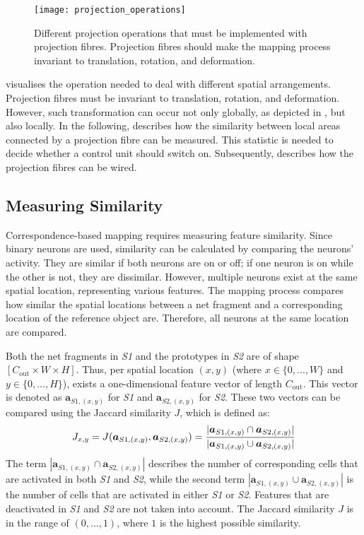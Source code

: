 \begin{figure}[h]
    \centering
    \texttt{[image: projection\_operations]}
    \caption[Different projection operation]{Different projection operations that must be implemented with projection fibres. Projection fibres should make the mapping process invariant to translation, rotation, and deformation.}
\end{figure}
 visualises the operation needed to deal with different spatial arrangements.
Projection fibres must be invariant to translation, rotation, and deformation. However, such transformation can occur not only globally, as depicted in , but also locally.
In the following,  describes how the similarity between local areas connected by a projection fibre can be measured. This statistic is needed to decide whether a control unit should switch on. Subsequently,  describes how the projection fibres can be wired.

\subsection{Measuring Similarity}
Correspondence-based mapping requires measuring feature similarity.
Since binary neurons are used, similarity can be calculated by comparing the neurons' activity. They are similar if both neurons are on or off; if one neuron is on while the other is not, they are dissimilar.
However, multiple neurons exist at the same spatial location, representing various features.
The mapping process compares how similar the spatial locations between a net fragment and a corresponding location of the reference object are.
Therefore, all neurons at the same location are compared.

Both the net fragments in \emph{S1} and the prototypes in \emph{S2} are of shape $[C_{\text{out}} \times W \times H]$. Thus, per spatial location $(x,y)$ (where $x \in \{0, ..., W\}$ and $y \in \{0, ..., H\}$), exists a one-dimensional feature vector of length $C_{\text{out}}$. This vector is denoted as $\boldsymbol{a}_{S1,(x,y)}$ for \emph{S1} and $\boldsymbol{a}_{S2,(x,y)}$ for \emph{S2}.
These two vectors can be compared using the Jaccard similarity $J$, which is defined as:
%
\begin{align}\eqlbl{jaccard}
	J_{x,y} = J(\boldsymbol{a}_{S1,(x,y)}, \boldsymbol{a}_{S2,(x,y)}) = \frac{|\boldsymbol{a}_{S1,(x,y)} \cap \boldsymbol{a}_{S2,(x,y)}|}{|\boldsymbol{a}_{S1,(x,y)} \cup \boldsymbol{a}_{S2,(x,y)}|}
\end{align}
%
The term $|\boldsymbol{a}_{S1,(x,y)} \cap \boldsymbol{a}_{S2,(x,y)}|$ describes the number of corresponding cells that are activated in both \emph{S1} and \emph{S2}, while the second term $|\boldsymbol{a}_{S1,(x,y)} \cup \boldsymbol{a}_{S2,(x,y)}|$ is the number of cells that are activated in either \emph{S1} or \emph{S2}. Features that are deactivated in \emph{S1} and \emph{S2} are not taken into account.
The Jaccard similarity $J$ is in the range of $(0, ..., 1)$, where $1$ is the highest possible similarity.


